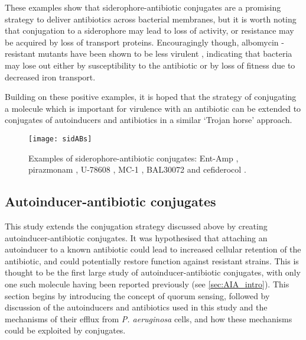 These examples show that siderophore-antibiotic conjugates are a promising strategy to deliver antibiotics across bacterial membranes, but it is worth noting that conjugation to a siderophore may lead to loss of activity, or resistance may be acquired by loss of transport proteins. Encouragingly though, albomycin -resistant mutants have been shown to be less virulent \cite{Pramanik2007}, indicating that bacteria may lose out either by susceptibility to the antibiotic or by loss of fitness due to decreased iron transport. 

Building on these positive examples, it is hoped that the strategy of conjugating a molecule which is important for virulence\cite{Vasil1999} with an antibiotic can be extended to conjugates of autoinducers and antibiotics in a similar `Trojan horse' approach.

\begin{figure}[H]
	\begin{center}
		\texttt{[image: sidABs]}
		\caption{Examples of siderophore-antibiotic conjugates: Ent-Amp \cite{Zheng2014}, 
		pirazmonam \cite{Zurenko1990,Harrington2012}, 
		U-78608 ,\cite{Zurenko1990,Harrington2012} 
		MC-1 \cite{McPherson2012},  
		BAL30072 \cite{Page2013}
		and cefiderocol \cite{Ito2018,Saisho2018}.
		\label{fgr:synthsidABs}}
	\end{center}
\end{figure}



\subsection{Autoinducer-antibiotic conjugates\label{sec:AIABs}}


This study extends the conjugation strategy discussed above by creating autoinducer-antibiotic conjugates. It was hypothesised that attaching an autoinducer to a known antibiotic could lead to increased cellular retention of the antibiotic, and could potentially restore function against resistant strains. This is thought to be the first large study of autoinducer-antibiotic conjugates, with only one such molecule having been reported previously\cite{Ganguly2011} (see \ref{sec:AIA_intro}).
This section begins by introducing the concept of quorum sensing, followed by discussion of the autoinducers and antibiotics used in this study and the mechanisms of their efflux from \textit{P. aeruginosa} cells, and how these mechanisms could be exploited by conjugates.


